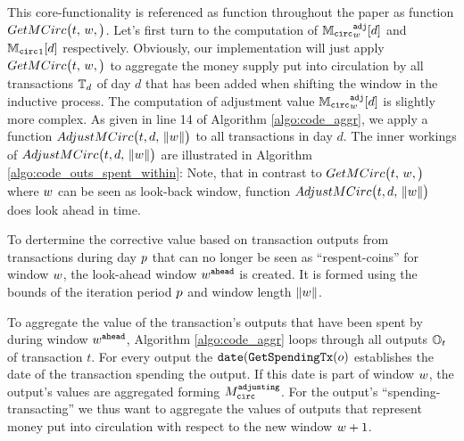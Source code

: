 This core-functionality is referenced as function throughout the paper as function \(GetMCirc\bigl(t,\,{w},\bigr)\). %
Let's first turn to the computation of \({{\mathbb{M}_{\mathtt{circ}}}^{\mathtt{adj}}_{{w}}}[d]\) and \({\mathbb{M}_{\mathtt{circ}}}_{1}[d]\) respectively. %
Obviously, our implementation will just apply \(GetMCirc\bigl(t,\,{w},\bigr)\) to aggregate the money supply put into circulation by all transactions \({{\mathbb{T}}_{d}}\) of day \(d\) that has been added when shifting the window in the inductive process. %
The computation of adjustment value \({{\mathbb{M}_{\mathtt{circ}}}^{\mathtt{adj}}_{{w}}}[d]\) is slightly more complex. %
As given in line 14 of Algorithm \ref{algo:code_aggr}, we apply a function \(AdjustMCirc\bigl(t, d,\,{\lVert w \rVert}\bigr)\) to all transactions in day \(d\). %
The inner workings of \(AdjustMCirc\bigl(t, d,\,{\lVert w \rVert}\bigr)\) are illustrated in Algorithm \ref{algo:code_outs_spent_within}: %
Note, that in contrast to \(GetMCirc\bigl(t,\,{w},\bigr)\) where \({w}\) can be seen as look-back window, function \(AdjustMCirc\bigl(t, d,\,{\lVert w \rVert}\bigr)\) does look ahead in time. %

To dertermine the corrective value based on transaction outputs from transactions during day \({p}\) that can no longer be seen as ``respent-coins'' for window \({w}\), the look-ahead window \({w}^{\mathtt{ahead}}\) is created. %
It is formed using the bounds of the iteration period \({p}\) and window length \({\lVert w \rVert}\). %

To aggregate the value of the transaction's outputs that have been spent by during window \({w}^{\mathtt{ahead}}\), Algorithm \ref{algo:code_aggr} loops through all outputs \({\mathbb{O}}_{t}\) of transaction \(t\). %
For every output the \(\mathtt{date}({\mathtt{GetSpendingTx}}(o)\) establishes the date of the transaction spending the output. %
If this date is part of window \({w}\), the output's values are aggregated forming \({M_{\mathtt{circ}}^{\mathtt{adjusting}}}\). %
For the output's ``spending-transacting'' we thus want to aggregate the values of outputs that represent money put into circulation with respect to the new window \({w} + 1\). %



